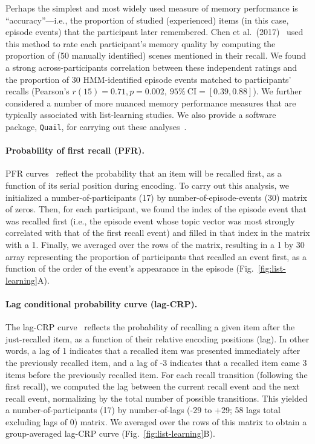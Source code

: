 \documentclass[10pt]{article}
\begin{document}
Perhaps the simplest and most widely used measure of memory performance is ``accuracy''---i.e., the proportion of studied (experienced) items (in this case, episode events) that the participant later remembered.  Chen et al.~(2017)~\cite{ChenEtal17} used this method to rate each participant's memory quality by computing the proportion of (50 manually identified) scenes mentioned in their recall.  We found a strong across-participants correlation between these independent ratings and the proportion of 30 HMM-identified episode events matched to participants' recalls (Pearson's $r(15) = 0.71, p = 0.002,~95\%~\mathrm{CI} = [0.39, 0.88]$).  We further considered a number of more nuanced memory performance measures that are typically associated with list-learning studies.  We also provide a software package, \texttt{Quail}, for carrying out these analyses~\citep{HeusEtal17b}.

\paragraph{Probability of first recall (PFR).}  PFR curves~\citep{WelcBurn24, PostPhil65, AtkiShif68} reflect the probability that an item will be recalled first, as a function of its serial position during encoding. To carry out this analysis, we initialized a number-of-participants (17) by number-of-episode-events (30) matrix of zeros. Then, for each participant, we found the index of the episode event that was recalled first (i.e., the episode event whose topic vector was most strongly correlated with that of the first recall event) and filled in that index in the matrix with a 1.  Finally, we averaged over the rows of the matrix, resulting in a 1 by 30 array representing the proportion of participants that recalled an event first, as a function of the order of the event's appearance in the episode (Fig.~\ref{fig:list-learning}A).

\paragraph{Lag conditional probability curve (lag-CRP).} The lag-CRP curve~\citep{Kaha96} reflects the probability of recalling a given item after the just-recalled item, as a function of their relative encoding positions (lag).  In other words, a lag of 1 indicates that a recalled item was presented immediately after the previously recalled item, and a lag of -3 indicates that a recalled item came 3 items before the previously recalled item.  For each recall transition (following the first recall), we computed the lag between the current recall event and the next recall event, normalizing by the total number of possible transitions.  This yielded a number-of-participants (17) by number-of-lags (-29 to +29; 58 lags total excluding lags of 0) matrix. We averaged over the rows of this matrix to obtain a group-averaged lag-CRP curve (Fig.~\ref{fig:list-learning}B).
\end{document}
